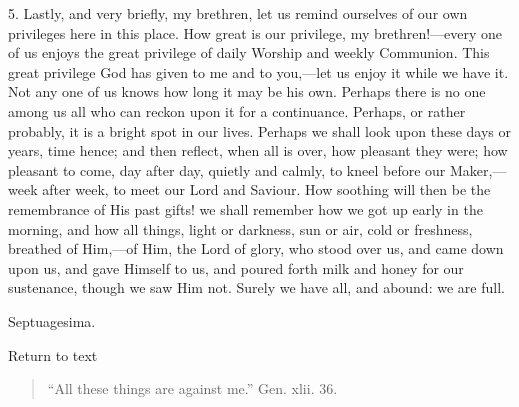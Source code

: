5. Lastly, and very briefly, my brethren, let us remind ourselves
of our own privileges here in this place. How great is our privilege,
my brethren!—every one of us enjoys the great privilege of daily
Worship and weekly Communion. This great privilege God has given to me
and to you,—let us enjoy it while we have it. Not any one of us
knows how long it may be his own. Perhaps there is no one among us all
who can reckon upon it for a continuance. Perhaps, or rather probably,
it is a bright spot in our lives. Perhaps we shall look upon these
days or years, time hence; and then reflect, when all is over, how
pleasant they were; how pleasant to come, day after day, quietly and
calmly, to kneel before our Maker,—week after week, to meet our Lord
and Saviour. How soothing will then be the remembrance of His past
gifts! we shall remember how we got up early in the morning, and how
all things, light or darkness, sun or air, cold or freshness, breathed
of Him,—of Him, the Lord of glory, who stood over us, and came down
upon us, and gave Himself to us, and poured forth milk and honey for
our sustenance, though we saw Him not. Surely we have all, and abound:
we are full.


Septuagesima.

Return to text


\begin{quote}

``All these things are against me.'' Gen. xlii. 36.

\end{quote}

